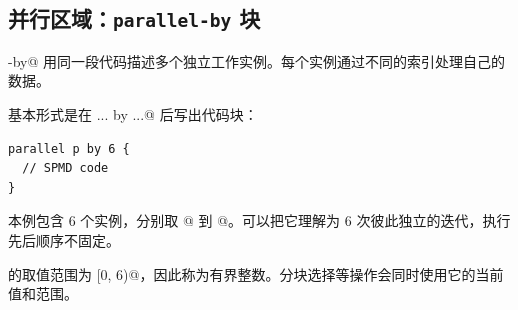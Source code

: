 \subsection*{并行区域：\texttt{parallel-by} 块}

\co@parallel-by@ 用同一段代码描述多个独立工作实例。每个实例通过不同的索引处理自己的数据。

基本形式是在 \co@parallel ... by ...@ 后写出代码块：

\begin{lstlisting}[language=croqtile,caption={并行区域：parallel-by 块}]
parallel p by 6 {
  // SPMD code
}
\end{lstlisting}

本例包含 6 个实例，\co@p@ 分别取 @ 到 @。可以把它理解为 6 次彼此独立的迭代，执行先后顺序不固定。

\co@p@ 的取值范围为 \co@[0, 6)@，因此称为有界整数。分块选择等操作会同时使用它的当前值和范围。
